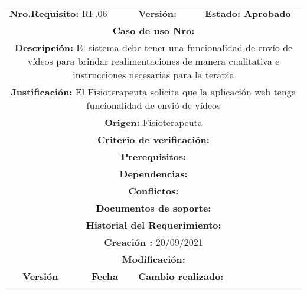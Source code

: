 \begin{center}
        
        
        
        
        
        \begin{tabular}{|c|c|p{4cm}|p{4cm}|}
            \hline
            \rowcolor{yellow} \multicolumn{4}{|c|}{\textbf{Prioridad:} Baja}  \\
            \hline
            \multicolumn{2}{|l}{\textbf{Nro.Requisito: }RF.06} & \multicolumn{1}{l|}{\textbf{Versión: }} & \multicolumn{1}{|l|}{\textbf{Estado: Aprobado}}  \\
            \multicolumn{4}{|p{12cm}|}{\textbf{Caso de uso Nro: }}  \\
            \hline
            \multicolumn{4}{|p{13cm}|}{\textbf{Descripción: }El sistema debe tener una funcionalidad de envío de vídeos para brindar realimentaciones de manera cualitativa e instrucciones necesarias para la terapia}  \\
            \multicolumn{4}{|p{13cm}|}{\textbf{Justificación: }El Fisioterapeuta solicita que la aplicación web tenga funcionalidad de envió de vídeos}  \\
            \multicolumn{4}{|p{12cm}|}{\textbf{Origen: }Fisioterapeuta}  \\
            \multicolumn{4}{|p{13cm}|}{\textbf{Criterio de verificación: }}  \\
            \hline
            \multicolumn{4}{|p{13cm}|}{\textbf{Prerequisitos: }}  \\
            \hline \multicolumn{4}{|p{12cm}|}{\textbf{Dependencias: }
               }  \\
            \multicolumn{4}{|p{12cm}|}{\textbf{Conflictos: }}  \\
            \hline
            \multicolumn{4}{|p{12cm}|}{\textbf{Documentos de soporte: }}  \\
            \hline
            \multicolumn{4}{|p{12cm}|}{\textbf{Historial del Requerimiento: }}  \\
            \multicolumn{4}{|p{12cm}|}{\textbf{Creación : }20/09/2021}  \\
            \multicolumn{4}{|p{12cm}|}{\textbf{Modificación: }}  \\
             \textbf{Versión} & \textbf{Fecha} & \multicolumn{2}{p{8cm}|}{\textbf{Cambio realizado:}} \\
            \hline
                    & &   \multicolumn{2}{p{8cm}|}{}
              \\
            \hline
        \end{tabular}
        

\end{center}
